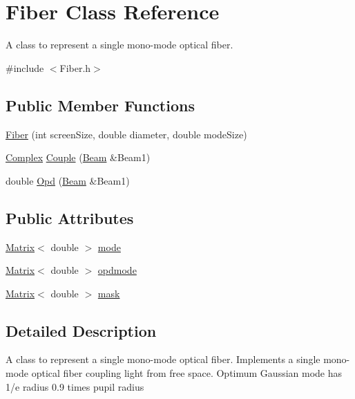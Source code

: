 \hypertarget{classFiber}{
\section{Fiber Class Reference}
\label{classFiber}
}


A class to represent a single mono-\/mode optical fiber.  




{\ttfamily \#include $<$Fiber.h$>$}

\subsection*{Public Member Functions}
\begin{DoxyCompactItemize}
\item 
\hyperlink{classFiber_a2ff0d3eb99b7370701ab14269c748d6d}{Fiber} (int screenSize, double diameter, double modeSize)
\item 
\hyperlink{Matrix_8h_a37333e1628babc1863d6963489e5e9ea}{Complex} \hyperlink{classFiber_a110c2c9c3af86fe6f819a311818792d5}{Couple} (\hyperlink{classBeam}{Beam} \&Beam1)
\item 
double \hyperlink{classFiber_a84c255aae041b642059f71f013f08c7a}{Opd} (\hyperlink{classBeam}{Beam} \&Beam1)
\end{DoxyCompactItemize}
\subsection*{Public Attributes}
\begin{DoxyCompactItemize}
\item 
\hyperlink{classMatrix}{Matrix}$<$ double $>$ \hyperlink{classFiber_a58eedc1ce162ecbe7c79dfd9dc929b47}{mode}
\item 
\hyperlink{classMatrix}{Matrix}$<$ double $>$ \hyperlink{classFiber_a35e7392023f24af150bf5d0efdcf2573}{opdmode}
\item 
\hyperlink{classMatrix}{Matrix}$<$ double $>$ \hyperlink{classFiber_a359261e31720929aa841bbd663c0aa97}{mask}
\end{DoxyCompactItemize}


\subsection{Detailed Description}
A class to represent a single mono-\/mode optical fiber. Implements a single mono-\/mode optical fiber coupling light from free space. Optimum Gaussian mode has 1/e radius 0.9 times pupil radius 

